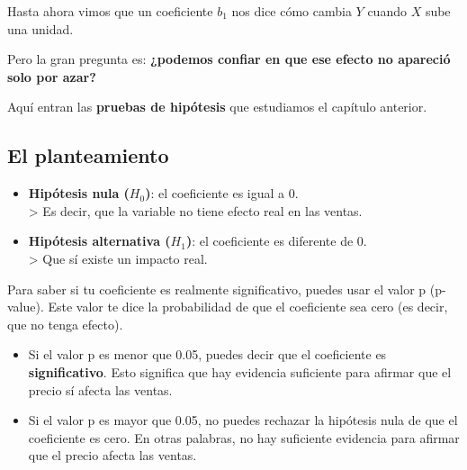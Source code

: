 \documentclass[
  spanish,
  letterpaper,
  DIV=11,
  numbers=noendperiod]{scrreprt}
\providecommand{\tightlist}{%
  \setlength{\itemsep}{0pt}\setlength{\parskip}{0pt}}
\begin{document}
Hasta ahora vimos que un coeficiente \(b_1\) nos dice cómo cambia \(Y\)
cuando \(X\) sube una unidad.

Pero la gran pregunta es: \textbf{¿podemos confiar en que ese efecto no
apareció solo por azar?}

Aquí entran las \textbf{pruebas de hipótesis} que estudiamos el capítulo
anterior.

\subsection{El planteamiento}\label{el-planteamiento}

\begin{itemize}
\tightlist
\item
  \textbf{Hipótesis nula (\(H_0\))}: el coeficiente es igual a 0.\\
  \textgreater{} Es decir, que la variable no tiene efecto real en las
  ventas.\\
\item
  \textbf{Hipótesis alternativa (\(H_1\))}: el coeficiente es diferente
  de 0.\\
  \textgreater{} Que sí existe un impacto real.
\end{itemize}

Para saber si tu coeficiente es realmente significativo, puedes usar el
valor p (p-value). Este valor te dice la probabilidad de que el
coeficiente sea cero (es decir, que no tenga efecto).

\begin{tcolorbox}[enhanced jigsaw, toptitle=1mm, opacitybacktitle=0.6, leftrule=.75mm, arc=.35mm, title=\textcolor{quarto-callout-note-color}{\faInfo}\hspace{0.5em}{Prueba de significancia estadística}, colback=white, bottomrule=.15mm, colbacktitle=quarto-callout-note-color!10!white, opacityback=0, bottomtitle=1mm, breakable, rightrule=.15mm, coltitle=black, left=2mm, titlerule=0mm, colframe=quarto-callout-note-color-frame, toprule=.15mm]

\begin{itemize}
\tightlist
\item
  Si el valor p es menor que 0.05, puedes decir que el coeficiente es
  \textbf{significativo}. Esto significa que hay evidencia suficiente
  para afirmar que el precio sí afecta las ventas.
\item
  Si el valor p es mayor que 0.05, no puedes rechazar la hipótesis nula
  de que el coeficiente es cero. En otras palabras, no hay suficiente
  evidencia para afirmar que el precio afecta las ventas.
\end{itemize}

\end{tcolorbox}
\end{document}
